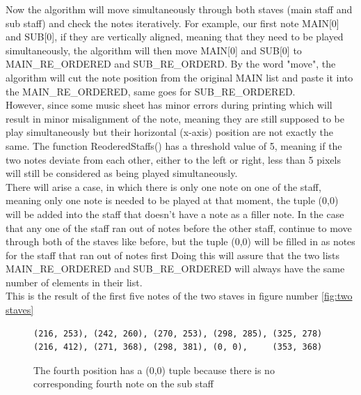 \documentclass[a4paper,12pt]{report}
\begin{document}
Now the algorithm will move simultaneously through both staves (main staff and sub staff) and check the
notes iteratively. For example, our first note MAIN[0] and SUB[0], if they
are vertically aligned, meaning that they need to be played simultaneously,
the algorithm will then move MAIN[0] and SUB[0] to MAIN\_RE\_ORDERED and
SUB\_RE\_ORDERD. By the word "move", the algorithm will cut the note
position from the original MAIN list and paste it into the
MAIN\_RE\_ORDERED, same goes for SUB\_RE\_ORDERED.\\

However, since some music sheet has  minor errors during printing which will result in minor
misalignment of the note, meaning they are still supposed to be play
simultaneously but their horizontal (x-axis) position are not exactly the
same. The function ReoderedStaffs() has a threshold value of 5, meaning if
the two notes deviate from each other, either to the left or right, less than
5 pixels will still be considered as being played simultaneously.\\

There will arise a case, in which there is only one note on one of the staff, meaning
only one note is needed to be played at that moment, the tuple (0,0) will be added
into the staff that doesn't have a note as a filler note. In the case that any one of the
staff ran out of notes before the other staff, continue to move through both of the
staves like before, but the tuple (0,0) will be filled in as notes for the staff that ran out of notes first
Doing this will assure that the two lists MAIN\_RE\_ORDERED and SUB\_RE\_ORDERED will
always have the same number of elements in their list.\\

\noindent This is the result of the first five notes of the two staves in figure number
\ref{fig:two staves}\\

\begin{figure}[H]
\begin{verbatim}
(216, 253), (242, 260), (270, 253), (298, 285), (325, 278)
(216, 412), (271, 368), (298, 381), (0, 0),     (353, 368)
\end{verbatim}
\caption{The fourth position has a (0,0) tuple because there is no corresponding fourth
note on the sub staff}
\end{figure}
\end{document}
